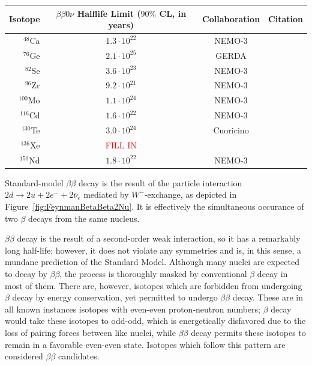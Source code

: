 \begin{tabular}{|rccc|}
\hline Isotope & \shortstack{$\beta\beta 0\nu$ Halflife Limit \\ ($90\%$ CL, in years)} & Collaboration & Citation \\ \hline
$^{48}$Ca & $1.3 \cdot 10^{22}$ & NEMO-3 & \cite{NEMO2011RandomOtherIsotopes}\\
$^{76}$Ge & $2.1 \cdot 10^{25}$ & GERDA & \cite{PhysRevLett.111.122503} \\
$^{82}$Se & $3.6 \cdot 10^{23}$ & NEMO-3 & \cite{NEMO2011RandomOtherIsotopes}\\
$^{96}$Zr & $9.2 \cdot 10^{21}$ & NEMO-3 & \cite{Argyriades2010168}\\
$^{100}$Mo & $1.1 \cdot 10^{24}$ & NEMO-3 & \cite{NEMO3-2013-100Mo}\\
$^{116}$Cd & $1.6 \cdot 10^{22}$ & NEMO-3 & \cite{NEMO2011RandomOtherIsotopes}\\
$^{130}$Te & $3.0 \cdot 10^{24}$ & Cuoricino & \cite{PhysRevC.78.035502}\\
$^{136}$Xe & \textcolor{red}{FILL IN} & & \\
$^{150}$Nd & $1.8 \cdot 10^{22}$ & NEMO-3 & \cite{PhysRevC.80.032501}\\
\hline
\end{tabular}


Standard-model $\beta\beta$ decay is the result of the particle interaction $2d \rightarrow 2u + 2e^- + 2\bar{\nu}_e$ mediated by $W^-$-exchange, as depicted in Figure~\ref{fig:FeynmanBetaBeta2Nu}.  It is effectively the simultaneous occurance of two $\beta$ decays from the same nucleus.

$\beta\beta$ decay is the result of a second-order weak interaction, so it has a remarkably long half-life; however, it does not violate any symmetries and is, in this sense, a mundane prediction of the Standard Model.  Although many nuclei are expected to decay by $\beta\beta$, the process is thoroughly masked by conventional $\beta$ decay in most of them.  There are, however, isotopes which are forbidden from undergoing $\beta$ decay by energy conservation, yet permitted to undergo $\beta\beta$ decay.  These are in all known instances isotopes with even-even proton-neutron numbers; $\beta$ decay would take these isotopes to odd-odd, which is energetically disfavored due to the loss of pairing forces between like nuclei, while $\beta\beta$ decay permits these isotopes to remain in a favorable even-even state.  Isotopes which follow this pattern are considered $\beta\beta$ candidates.

